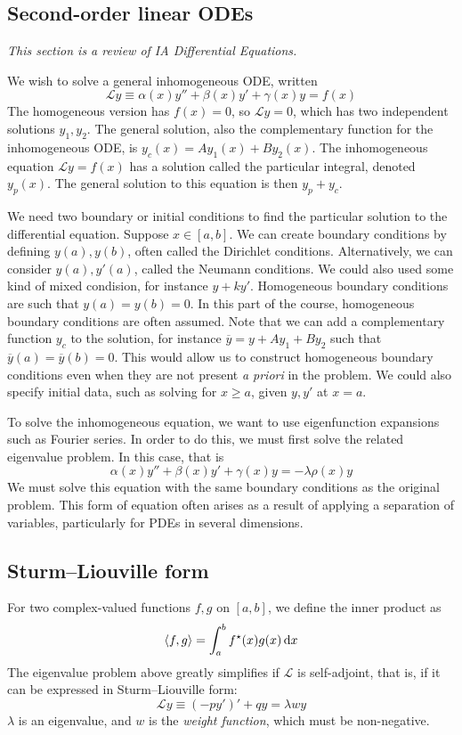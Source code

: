 \subsection{Second-order linear ODEs}
\textit{This section is a review of IA Differential Equations.}

We wish to solve a general inhomogeneous ODE, written
\[
	\mathcal L y \equiv \alpha(x) y'' + \beta(x) y' + \gamma(x) y = f(x)
\]
The homogeneous version has \( f(x) = 0 \), so \( \mathcal L y = 0 \), which has two independent solutions \( y_1, y_2 \).
The general solution, also the complementary function for the inhomogeneous ODE, is \( y_c(x) = A y_1(x) + B y_2(x) \).
The inhomogeneous equation \( \mathcal L y = f(x) \) has a solution called the particular integral, denoted \( y_p(x) \).
The general solution to this equation is then \( y_p + y_c \).

We need two boundary or initial conditions to find the particular solution to the differential equation.
Suppose \( x \in [a,b] \).
We can create boundary conditions by defining \( y(a), y(b) \), often called the Dirichlet conditions.
Alternatively, we can consider \( y(a), y'(a) \), called the Neumann conditions.
We could also used some kind of mixed condision, for instance \( y + ky' \).
Homogeneous boundary conditions are such that \( y(a) = y(b) = 0 \).
In this part of the course, homogeneous boundary conditions are often assumed.
Note that we can add a complementary function \( y_c \) to the solution, for instance \( \overline{y} = y + A y_1 + B y_2 \) such that \( \overline{y}(a) = \overline{y}(b) = 0 \).
This would allow us to construct homogeneous boundary conditions even when they are not present \textit{a priori} in the problem.
We could also specify initial data, such as solving for \( x \geq a \), given \( y, y' \) at \( x = a \).

To solve the inhomogeneous equation, we want to use eigenfunction expansions such as Fourier series.
In order to do this, we must first solve the related eigenvalue problem.
In this case, that is
\[
	\alpha(x) y'' + \beta(x) y' + \gamma(x) y = -\lambda \rho(x) y
\]
We must solve this equation with the same boundary conditions as the original problem.
This form of equation often arises as a result of applying a separation of variables, particularly for PDEs in several dimensions.

\subsection{Sturm--Liouville form}
For two complex-valued functions \( f, g \) on \( [a,b] \), we define the inner product as
\[
	\left\langle{f,g}\right\rangle = \int_a^b f^\star(x) g(x) \dd{x}
\]
The eigenvalue problem above greatly simplifies if \( \mathcal L \) is self-adjoint, that is, if it can be expressed in Sturm--Liouville form:
\[
	\mathcal L y \equiv (-py')' + qy = \lambda w y
\]
\( \lambda \) is an eigenvalue, and \( w \) is the \textit{weight function}, which must be non-negative.

